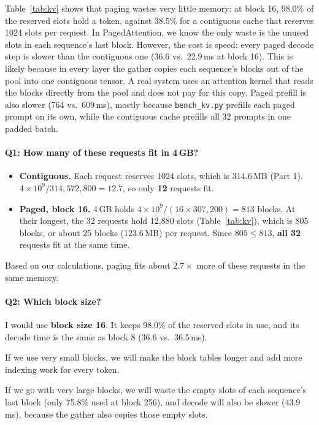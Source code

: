 \documentclass[10pt]{article}
\begin{document}
Table~\ref{tab:kv} shows that paging wastes very little memory: at block
16, 98.0\% of the reserved slots hold a token, against 38.5\% for a
contiguous cache that reserves 1024 slots per request. In PagedAttention, 
we know the only waste is the unused slots in each sequence's last block.
However, the cost is speed: every paged decode step is slower than the contiguous one
(36.6 vs.\ 22.9\,ms at block 16).
This is likely because in every layer the gather copies each sequence's
blocks out of the pool into one contiguous tensor. A real system uses an
attention kernel that reads the blocks directly from the pool and does
not pay for this copy. Paged prefill is also slower (764 vs.\ 609\,ms),
mostly because \texttt{bench\_kv.py} prefills each paged prompt on its
own, while the contiguous cache prefills all 32 prompts in one padded
batch.

\paragraph{Q1: How many of these requests fit in 4\,GB?}
\begin{itemize}
\item \textbf{Contiguous.} Each request reserves 1024 slots, which is
  314.6\,MB (Part 1).
  $4 \times 10^9 / 314{,}572{,}800 = 12.7$, so only \textbf{12} requests
  fit.
\item \textbf{Paged, block 16.} 4\,GB holds
  $4 \times 10^9 / (16 \times 307{,}200) = 813$ blocks. At their longest,
  the 32 requests hold 12{,}880 slots (Table~\ref{tab:kv}), which is
  805 blocks, or about 25 blocks (123.6\,MB) per request. Since
  $805 \le 813$, \textbf{all 32} requests fit at the same time.
\end{itemize}
Based on our calculations, paging fits about $2.7\times$ more of these
requests in the same memory.

\paragraph{Q2: Which block size?}
I would use \textbf{block size 16}. It keeps 98.0\% of the reserved slots
in use, and its decode time is the same as block 8 (36.6 vs.\ 36.5\,ms).

If we use very small blocks, we will make the block tables longer
and add more indexing work for every token. 

If we go with very large blocks, we will waste the empty slots of each
sequence's last block (only 75.8\% used at block 256), and decode will also be slower
(43.9\,ms), because the gather also copies those empty slots.
\end{document}

